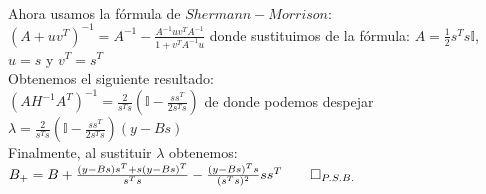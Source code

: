 \documentclass[12pt]{article}
\begin{document}
\\
Ahora usamos la f\'ormula de $Shermann-Morrison$: $(A + uv^{T})^{-1} = A^{-1} - \frac{A^{-1} uv^{T}A^{-1}}{1+ v^{T}A^{-1}u}$ donde sustituimos de la f\'ormula: $A=\frac{1}{2}s^{T}s\mathbb{I}$, $u=s$ y $v^{T}=s^{T}$
\\
Obtenemos el siguiente resultado:
\\
$(AH^{-1}A^{T})^{-1} = \frac{2}{s^{T}s} \left( \mathbb{I} - \frac{ss^{T}}{2s^{T}s} \right)$ de donde podemos despejar
\\
$\lambda = \frac{2}{s^{T}s} \left( \mathbb{I} - \frac{ss^{T}}{2s^{T}s} \right) (y - Bs)$
\\
Finalmente, al sustituir $\lambda$ obtenemos:
\\
$B_{+} = B + \frac{(y-Bs)s^{T} + s(y-Bs)^{T}}{s^{T}s} - \frac{(y-Bs)^{T}s}{(s^{T}s)^{2}}ss^{T} \qed_{P.S.B.}$

\enddocument
\end{document}
